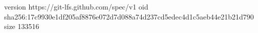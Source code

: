 version https://git-lfs.github.com/spec/v1
oid sha256:17c9930e1df205af8876e072d7d088a74d237cd5edec4d1c5aeb44e21b21d790
size 133516
